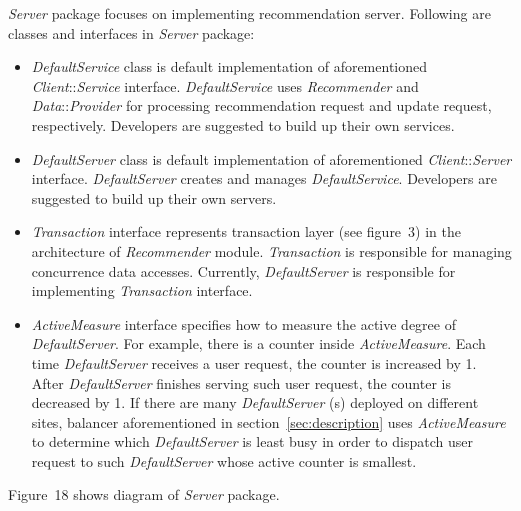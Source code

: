 \documentclass[a4paper]{llncs}
\begin{document}
\textit{Server} package focuses on implementing recommendation server. Following are classes and interfaces in \textit{Server} package:
\begin{itemize}
\item \textit{DefaultService} class is default implementation of aforementioned \textit{Client}::\textit{Service} interface. \textit{DefaultService} uses \textit{Recommender} and \textit{Data}::\textit{Provider} for processing recommendation request and update request, respectively. Developers are suggested to build up their own services.

\item \textit{DefaultServer} class is default implementation of aforementioned \textit{Client}::\textit{Server} interface. \textit{DefaultServer} creates and manages \textit{DefaultService}. Developers are suggested to build up their own servers.

\item \textit{Transaction} interface represents transaction layer (see figure~3) in the architecture of \textit{Recommender} module. \textit{Transaction} is responsible for managing concurrence data accesses. Currently, \textit{DefaultServer} is responsible for implementing \textit{Transaction} interface.

\item \textit{ActiveMeasure} interface specifies how to measure the active degree of \textit{DefaultServer}. For example, there is a counter inside \textit{ActiveMeasure}. Each time \textit{DefaultServer} receives a user request, the counter is increased by 1. After \textit{DefaultServer} finishes serving such user request, the counter is decreased by 1. If there are many \textit{DefaultServer} (s) deployed on different sites, balancer aforementioned in section~\ref{sec:description} uses \textit{ActiveMeasure} to determine which \textit{DefaultServer} is least busy in order to dispatch user request to such \textit{DefaultServer} whose active counter is smallest.
\end{itemize}
Figure~18 shows diagram of \textit{Server} package.
\end{document}
